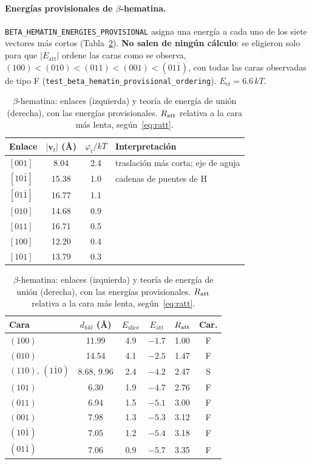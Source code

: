 \documentclass[11pt,a4paper]{article}
\newcommand{\code}[1]{\texttt{#1}}
\newcommand{\vect}[1]{\mathbf{#1}}
\newcommand{\Ecr}{E_{\mathrm{cr}}}
\newcommand{\Eslice}{E_{\mathrm{slice}}}
\newcommand{\Eatt}{E_{\mathrm{att}}}
\newcommand{\bh}{$\beta$-hematina}
\begin{document}
\paragraph{Energías provisionales de \bh{}.} \code{BETA\_HEMATIN\_ENERGIES\_PROVISIONAL} asigna una
energía a cada uno de los siete vectores más cortos (Tabla~\ref{tab:bh}). \textbf{No salen de ningún
cálculo}: se eligieron solo para que $|\Eatt|$ ordene las caras como se observa,
$(100)<(010)<(011)<(001)<(01\bar1)$, con todas las caras observadas de tipo F
(\code{test\_beta\_hematin\_provisional\_ordering}). $\Ecr=6.6\,kT$.

\begin{table}[t]
\centering\small
\caption{\bh{}: enlaces (izquierda) y teoría de energía de unión (derecha), con las energías
provisionales. $R_{\rm att}$ relativa a la cara más lenta, según~\eqref{eq:ratt}.}
\label{tab:bh}
\begin{tabular}{@{}lccl@{}}
\toprule
Enlace & $|\vect v_t|$ (Å) & $\varphi_t/kT$ & Interpretación\\
\midrule
$[001]$ & 8.04 & 2.4 & traslación más corta; eje de aguja\\
$[10\bar1]$ & 15.38 & 1.0 & cadenas de puentes de H\\
$[01\bar1]$ & 16.77 & 1.1 & \\
$[010]$ & 14.68 & 0.9 & \\
$[011]$ & 16.71 & 0.5 & \\
$[100]$ & 12.20 & 0.4 & \\
$[101]$ & 13.79 & 0.3 & \\
\bottomrule
\end{tabular}\hfill
\begin{tabular}{@{}lccccc@{}}
\toprule
Cara & $d_{hkl}$ (Å) & $\Eslice$ & $\Eatt$ & $R_{\rm att}$ & Car.\\
\midrule
$(100)$ & 11.99 & 4.9 & $-1.7$ & 1.00 & F\\
$(010)$ & 14.54 & 4.1 & $-2.5$ & 1.47 & F\\
$(110)$, $(1\bar10)$ & 8.68, 9.96 & 2.4 & $-4.2$ & 2.47 & S\\
$(101)$ & 6.30 & 1.9 & $-4.7$ & 2.76 & F\\
$(011)$ & 6.94 & 1.5 & $-5.1$ & 3.00 & F\\
$(001)$ & 7.98 & 1.3 & $-5.3$ & 3.12 & F\\
$(10\bar1)$ & 7.05 & 1.2 & $-5.4$ & 3.18 & F\\
$(01\bar1)$ & 7.06 & 0.9 & $-5.7$ & 3.35 & F\\
\bottomrule
\end{tabular}
\end{table}
\end{document}
